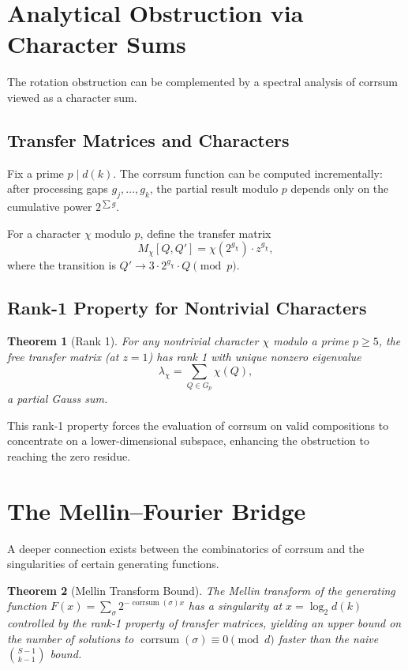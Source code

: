 \documentclass[12pt,a4paper]{amsart}
\theoremstyle{plain}
\newtheorem{theorem}{Theorem}[section]
\theoremstyle{definition}
\newcommand{\corrsum}{\operatorname{corrsum}}
\begin{document}
\section{Analytical Obstruction via Character Sums}
\label{sec:character}

The rotation obstruction can be complemented by a spectral analysis of corrsum viewed as a character sum.

\subsection{Transfer Matrices and Characters}

Fix a prime $p \mid d(k)$. The corrsum function can be computed incrementally: after processing gaps $g_j, \ldots, g_k$, the partial result modulo $p$ depends only on the cumulative power $2^{\sum g}$.

For a character $\chi$ modulo $p$, define the transfer matrix
\[
M_\chi[Q, Q'] = \chi(2^{g_\chi}) \cdot z^{g_\chi},
\]
where the transition is $Q' \to 3 \cdot 2^{g_\chi} \cdot Q \pmod{p}$.

\subsection{Rank-1 Property for Nontrivial Characters}

\begin{theorem}[Rank 1]
\label{thm:rank1}
For any nontrivial character $\chi$ modulo a prime $p \geq 5$, the free transfer matrix (at $z=1$) has rank 1 with unique nonzero eigenvalue
\[
\lambda_\chi = \sum_{Q \in G_p} \chi(Q),
\]
a partial Gauss sum.
\end{theorem}

This rank-1 property forces the evaluation of corrsum on valid compositions to concentrate on a lower-dimensional subspace, enhancing the obstruction to reaching the zero residue.

\section{The Mellin--Fourier Bridge}
\label{sec:mellin}

A deeper connection exists between the combinatorics of corrsum and the singularities of certain generating functions.

\begin{theorem}[Mellin Transform Bound]
\label{thm:mellin}
The Mellin transform of the generating function $F(x) = \sum_\sigma 2^{-\corrsum(\sigma) x}$ has a singularity at $x = \log_2 d(k)$ controlled by the rank-1 property of transfer matrices, yielding an upper bound on the number of solutions to $\corrsum(\sigma) \equiv 0 \pmod{d}$ faster than the naive $\binom{S-1}{k-1}$ bound.
\end{theorem}
\end{document}
